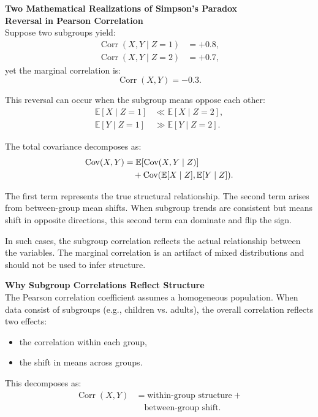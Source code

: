 \begin{technical}
{\Large\textbf{Two Mathematical Realizations of Simpson’s Paradox}}\\[0.7em]
\vspace{1em}
\noindent\textbf{Reversal in Pearson Correlation}\\[0.5em]
Suppose two subgroups yield:
\begin{align*}
\operatorname{Corr}(X, Y \mid Z=1) &= +0.8, \\
\operatorname{Corr}(X, Y \mid Z=2) &= +0.7,
\end{align*}
yet the marginal correlation is:
\[
\operatorname{Corr}(X, Y) = -0.3.
\]

This reversal can occur when the subgroup means oppose each other:
\begin{align*}
\mathbb{E}[X \mid Z=1] &\ll \mathbb{E}[X \mid Z=2], \\
\mathbb{E}[Y \mid Z=1] &\gg \mathbb{E}[Y \mid Z=2].
\end{align*}

The total covariance decomposes as:
\begin{align}
\operatorname{Cov}(X, Y) &= \mathbb{E}[\operatorname{Cov}(X, Y \mid Z)] \notag \\
&\quad + \operatorname{Cov}(\mathbb{E}[X \mid Z], \mathbb{E}[Y \mid Z]).
\end{align}

The first term represents the true structural relationship. The second term arises from between-group mean shifts. When subgroup trends are consistent but means shift in opposite directions, this second term can dominate and flip the sign.

In such cases, the subgroup correlation reflects the actual relationship between the variables. The marginal correlation is an artifact of mixed distributions and should not be used to infer structure.

\noindent\textbf{Why Subgroup Correlations Reflect Structure}\\[0.5em]
The Pearson correlation coefficient assumes a homogeneous population. When data consist of subgroups (e.g., children vs. adults), the overall correlation reflects two effects:
\begin{itemize}
\item the correlation within each group,
\item the shift in means across groups.
\end{itemize}

This decomposes as:
\begin{align*}
\operatorname{Corr}(X, Y) &= 
\text{within-group structure} +\\& \quad\text{between-group shift}.
\end{align*}


\end{technical}
